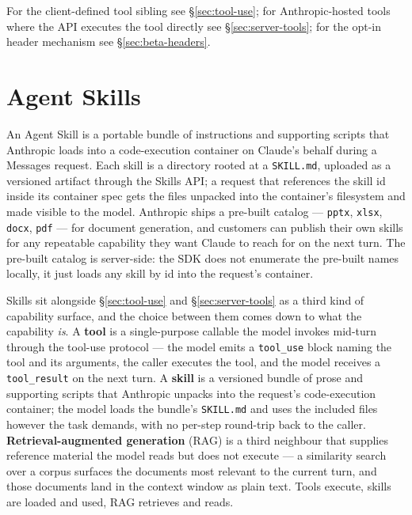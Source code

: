 \documentclass[a4paper,10pt,fleqn]{article}
\begin{document}
For the client-defined tool sibling see \S\ref{sec:tool-use}; for
Anthropic-hosted tools where the API executes the tool directly
see \S\ref{sec:server-tools}; for the opt-in header mechanism see
\S\ref{sec:beta-headers}.

\medskip
\begin{sloppypar}
\end{sloppypar}

\section{Agent Skills}
\label{sec:agent-skills}

An Agent Skill is a portable bundle of instructions and
supporting scripts that Anthropic loads into a code-execution
container on Claude's behalf during a Messages request.  Each
skill is a directory rooted at a \texttt{SKILL.md}, uploaded as a
versioned artifact through the Skills API; a request that
references the skill id inside its container spec gets the files
unpacked into the container's filesystem and made visible to the
model.  Anthropic ships a pre-built catalog --- \texttt{pptx},
\texttt{xlsx}, \texttt{docx}, \texttt{pdf} --- for document
generation, and customers can publish their own skills for any
repeatable capability they want Claude to reach for on the next
turn.  The pre-built catalog is server-side: the SDK does not
enumerate the pre-built names locally, it just loads any skill
by id into the request's container.

Skills sit alongside \S\ref{sec:tool-use} and
\S\ref{sec:server-tools} as a third kind of capability surface, and
the choice between them comes down to what the capability \emph{is}.
A \textbf{tool} is a single-purpose callable the model invokes
mid-turn through the tool-use protocol --- the model emits a
\texttt{tool\_use} block naming the tool and its arguments, the
caller executes the tool, and the model receives a
\texttt{tool\_result} on the next turn.  A \textbf{skill} is a
versioned bundle of prose and supporting scripts that Anthropic
unpacks into the request's code-execution container; the model loads
the bundle's \texttt{SKILL.md} and uses the included files however
the task demands, with no per-step round-trip back to the caller.
\textbf{Retrieval-augmented generation} (RAG) is a third neighbour
that supplies reference material the model reads but does not
execute --- a similarity search over a corpus surfaces the documents
most relevant to the current turn, and those documents land in the
context window as plain text.  Tools execute, skills are loaded and
used, RAG retrieves and reads.
\end{document}
